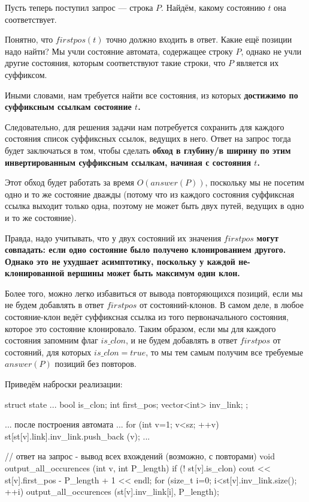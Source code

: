 Пусть теперь поступил запрос --- строка $P$. Найдём, какому состоянию $t$ она соответствует.

Понятно, что $firstpos(t)$ точно должно входить в ответ. Какие ещё позиции надо найти? Мы учли состояние автомата, содержащее строку $P$, однако не учли другие состояния, которым соответствуют такие строки, что $P$ является их суффиксом.

Иными словами, нам требуется найти все состояния, из которых \bf{достижимо по суффиксным ссылкам} состояние $t$.

Следовательно, для решения задачи нам потребуется сохранить для каждого состояния список суффиксных ссылок, ведущих в него. Ответ на запрос тогда будет заключаться в том, чтобы сделать \bf{обход в глубину/в ширину} по этим инвертированным суффиксным ссылкам, начиная с состояния $t$.

Этот обход будет работать за время $O (answer (P))$, поскольку мы не посетим одно и то же состояние дважды (потому что из каждого состояния суффиксная ссылка выходит только одна, поэтому не может быть двух путей, ведущих в одно и то же состояние).

Правда, надо учитывать, что у двух состояний их значения $firstpos$ \bf{могут совпадать}: если одно состояние было получено клонированием другого. Однако это не ухудшает асимптотику, поскольку у каждой не-клонированной вершины может быть максимум один клон.

Более того, можно легко избавиться от вывода повторяющихся позиций, если мы не будем добавлять в ответ $firstpos$ от состояний-клонов. В самом деле, в любое состояние-клон ведёт суффиксная ссылка из того первоначального состояния, которое это состояние клонировало. Таким образом, если мы для каждого состояния запомним флаг $is\_clon$, и не будем добавлять в ответ $firstpos$ от состояний, для которых $is\_clon = true$, то мы тем самым получим все требуемые $answer (P)$ позиций без повторов.

Приведём наброски реализации:

\code
struct state {
	...
	bool is_clon;
	int first_pos;
	vector<int> inv_link;
};


... после построения автомата ...
for (int v=1; v<sz; ++v)
	st[st[v].link].inv_link.push_back (v);
...


// ответ на запрос - вывод всех вхождений (возможно, с повторами)
void output_all_occurences (int v, int P_length) {
	if (! st[v].is_clon)
		cout << st[v].first_pos - P_length + 1 << endl;
	for (size_t i=0; i<st[v].inv_link.size(); ++i)
		output_all_occurences (st[v].inv_link[i], P_length);
}
\endcode


